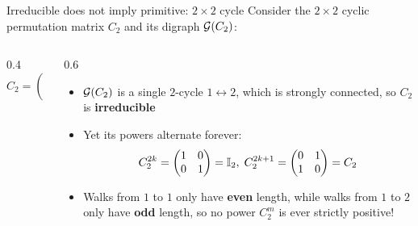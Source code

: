 \documentclass[aspectratio=169]{beamer}\usepackage[]{graphicx}\usepackage[]{xcolor}
\begin{document}
\begin{frame}{Irreducible does not imply primitive: $2 \times 2$ cycle}
Consider the $2 \times 2$ cyclic permutation matrix $C_2$ and its digraph $\mathcal{G}(C_2)$:
\vfill
\begin{columns}[c]
\begin{column}{0.4\textwidth}
\centering
\[
C_2 = \begin{pmatrix} 0 & 1 \\ 1 & 0 \end{pmatrix}
\]
\vspace{0.3cm}
\end{column}
\begin{column}{0.6\textwidth}
\begin{itemize}
\item $\mathcal{G}(C_2)$ is a single $2$-cycle $1 \leftrightarrow 2$, which is strongly connected, so $C_2$ is \textbf{irreducible}
\item Yet its powers alternate forever:
\[
C_2^{2k} = \begin{pmatrix} 1 & 0 \\ 0 & 1 \end{pmatrix} = \mathbb{I}_2,
\;
C_2^{2k+1} = \begin{pmatrix} 0 & 1 \\ 1 & 0 \end{pmatrix} = C_2
\]
\item Walks from $1$ to $1$ only have \textbf{even} length, while walks from $1$ to $2$ only have \textbf{odd} length, so no power $C_2^m$ is ever strictly positive!
\end{itemize}
\end{column}
\end{columns}
\end{frame}
\end{document}

